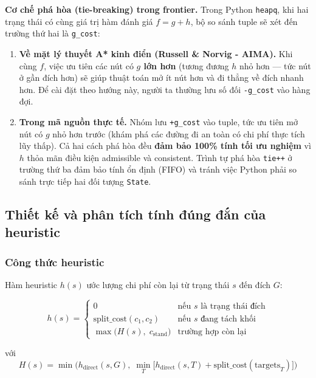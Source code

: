\begin{mdframed}[linecolor=blue!50!black, backgroundcolor=blue!3]
\textbf{Cơ chế phá hòa (tie-breaking) trong frontier.} Trong Python \texttt{heapq}, khi hai trạng thái có cùng giá trị hàm đánh giá $f = g + h$, bộ so sánh tuple sẽ xét đến trường thứ hai là \texttt{g\_\allowbreak{}cost}:

\begin{enumerate}
\item \textbf{Về mặt lý thuyết A* kinh điển (Russell \& Norvig - AIMA).} Khi cùng $f$, việc ưu tiên các nút có \textbf{$g$ lớn hơn} (tương đương $h$ nhỏ hơn — tức nút ở gần đích hơn) sẽ giúp thuật toán mở ít nút hơn và đi thẳng về đích nhanh hơn. Để cài đặt theo hướng này, người ta thường lưu số đối \texttt{-g\_\allowbreak{}cost} vào hàng đợi.
\item \textbf{Trong mã nguồn thực tế.} Nhóm lưu \texttt{+g\_\allowbreak{}cost} vào tuple, tức ưu tiên mở nút có $g$ nhỏ hơn trước (khám phá các đường đi an toàn có chi phí thực tích lũy thấp). Cả hai cách phá hòa đều \textbf{đảm bảo 100\% tính tối ưu nghiệm} vì $h$ thỏa mãn điều kiện admissible và consistent. Trình tự phá hòa \texttt{tie++} ở trường thứ ba đảm bảo tính ổn định (FIFO) và tránh việc Python phải so sánh trực tiếp hai đối tượng \texttt{State}.
\end{enumerate}
\end{mdframed}

\subsection{Thiết kế và phân tích tính đúng đắn của heuristic}

\subsubsection{Công thức heuristic}

Hàm heuristic $h(s)$ ước lượng chi phí còn lại từ trạng thái $s$ đến đích $G$:

\[h(s) = \begin{cases} 0 & \text{nếu } s \text{ là trạng thái đích} \\ \text{split\_cost}(c_1, c_2) & \text{nếu } s \text{ đang tách khối} \\ \max\!\big(H(s),\; c_{\text{stand}}\big) & \text{trường hợp còn lại} \end{cases}\]

với
\[H(s) = \min\!\Big(h_{\text{direct}}(s, G),\; \min_{T} \big[h_{\text{direct}}(s, T) + \text{split\_cost}(\text{targets}_T)\big]\Big)\]

